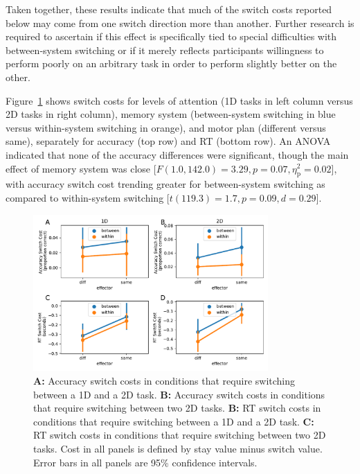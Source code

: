 \documentclass[doc, floatsintext]{apa7}
\begin{document}
Taken together, these results indicate that much of the
switch costs reported below may come from one switch
direction more than another. Further research is required to
ascertain if this effect is specifically tied to special
difficulties with between-system switching or if it merely
reflects participants willingness to perform poorly on an
arbitrary task in order to perform slightly better on the
other.

Figure~\ref{fig_6} shows switch costs for levels of
attention (1D tasks in left column versus 2D tasks in right
column), memory system (between-system switching in blue
versus within-system switching in orange), and motor plan
(different versus same), separately for accuracy (top row)
and RT (bottom row). An ANOVA indicated that none of the
accuracy differences were significant, though the main
effect of memory system was close [$F(1.0, 142.0) = 3.29, p
= 0.07, \eta_{\text{p}}^{2} = 0.02$], with accuracy switch
cost trending greater for between-system switching as
compared to within-system switching [$t(119.3) = 1.7, p =
0.09, d = 0.29$].

\begin{figure}[h!]
    \centering
    \includegraphics[width=0.8\textwidth]{../figures/fig_6.pdf}
    \caption{
        \textbf{A:} Accuracy switch costs in conditions that
        require switching between a 1D and a 2D task.
        \textbf{B:} Accuracy switch costs in conditions that
        require switching between two 2D tasks.
        \textbf{B:} RT switch costs in conditions that require
        switching between a 1D and a 2D task.
        \textbf{C:} RT switch costs in conditions that require
        switching between two 2D tasks.  Cost in all panels is
        defined by stay value minus switch value. Error bars in
        all panels are 95\% confidence intervals.
    }
    \label{fig_6}
\end{figure}
\end{document}

